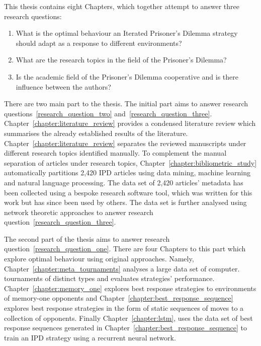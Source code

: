 This thesis contains eight Chapters, which together attempt to answer three research
questions:

\begin{enumerate}
    \item What is the optimal behaviour an Iterated Prisoner's Dilemma strategy should adapt as a response to different
 environments?\label{research_question_one}
    \item What are the research topics in the field of the Prisoner's Dilemma?\label{research_question_two}
    \item Is the academic field of the Prisoner's Dilemma cooperative and is there
    influence between the authors?\label{research_question_three}
\end{enumerate}

There are two main part to the thesis. The initial part aims to answer research
questions~\ref{research_question_two} and~\ref{research_question_three}.
Chapter~\ref{chapter:literature_review} provides a condensed
literature review which summarises the already established results of the
literature. Chapter~\ref{chapter:literature_review} separates the reviewed manuscripts
under different research topics identified manually. To complement the manual
separation of articles under research topics,
Chapter~\ref{chapter:bibliometric_study} automatically partitions 2,420 IPD
articles using data mining, machine learning and  natural language processing. The data set of 2,420 articles' metadata has
been collected using a bespoke research software tool, which was written for this work but has since been used by others. The data set is further
analysed using network theoretic approaches to answer research question~\ref{research_question_three}.

The second part of the thesis aims to answer research
question~\ref{research_question_one}. There are four Chapters to this part which
explore optimal behaviour using original approaches. Namely,
Chapter~\ref{chapter:meta_tournaments} analyses a large data set of computer. %
tournaments of distinct types and evaluates \numberofstrategies strategies'
performance. Chapter~\ref{chapter:memory_one} explores best response strategies
to environments of memory-one opponents and
Chapter~\ref{chapter:best_response_sequence} explores best response strategies
in the form of static sequences of moves to a collection of opponents. Finally
Chapter~\ref{chapter:lstm}, uses the data set of best response sequences
generated in Chapter~\ref{chapter:best_response_sequence} to train an IPD
strategy using a recurrent neural network.

